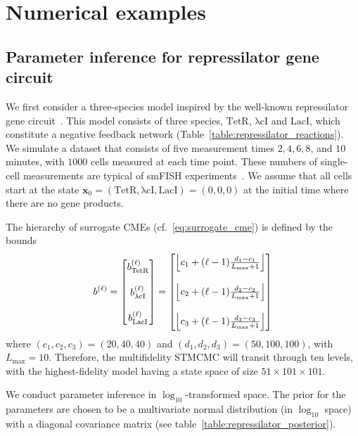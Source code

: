 \documentclass[1p]{article}
\DeclarePairedDelimiter\floor{\lfloor}{\rfloor}
\begin{document}
\section{Numerical examples}
\subsection{Parameter inference for repressilator gene circuit}
\def\TetR{\mathrm{TetR}}
\def\lambdacI{\mathrm{\lambda{cI}}}
\def\LacI{\mathrm{LacI}}
We first consider a three-species model inspired by the well-known repressilator gene circuit~\cite{Elowitz2000}. This model consists of three species, $\TetR$, $\lambdacI$ and $\LacI$, which constitute a negative feedback network (Table~\ref{table:repressilator_reactions}).
We simulate a dataset that consists of five measurement times $2, 4, 6, 8$, and $10$ minutes, with $1000$ cells measured at each time point. These numbers of single-cell measurements are typical of smFISH experiments~\cite{Raj2008, Kalb2019}.
%
We assume that all cells start at the state $\bm{x}_0 = (\TetR, \lambdacI, \LacI) = \left(0, 0, 0\right)$ at the initial time where there are no gene products.

The hierarchy of surrogate CMEs (cf.~\eqref{eq:surrogate_cme}) is defined by the bounds
$$
b^{(\ell)}
=
\begin{bmatrix}
  b_{\TetR}^{(\ell)} \\
  \\
  b_{\lambdacI}^{(\ell)} \\
  \\
  b_{\LacI}^{(\ell)}
\end{bmatrix}
=
\begin{bmatrix}
    \floor*{c_1 + (\ell-1)\frac{d_1 - c_1}{L_{\max} + 1}} \\
    \\
    \floor*{c_2 + (\ell-1)\frac{d_2 - c_2}{L_{\max} + 1}} \\
    \\
    \floor*{c_3 + (\ell-1)\frac{d_3 - c_3}{L_{\max} + 1}}
\end{bmatrix}
$$
where $(c_1, c_2, c_3) = (20, 40, 40)$ and $(d_1, d_2, d_3) = (50, 100, 100)$, with $L_{\max} = 10$. Therefore, the multifidelity STMCMC will transit through ten levels, with the highest-fidelity model having a state space of size $51\times 101 \times 101$.

We conduct parameter inference in $\log_{10}$-transformed space. The prior for the parameters are chosen to be a multivariate normal distribution (in $\log_{10}$ space) with a diagonal covariance matrix (see table~\ref{table:repressilator_posterior}).
\end{document}
